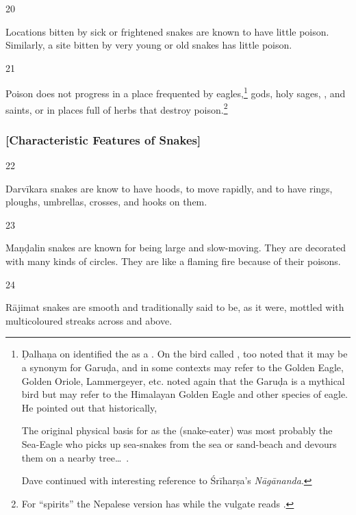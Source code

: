 \begin{translation}
\item [20]

Locations bitten by sick or frightened snakes are known to have little poison.  
Similarly, a site bitten by very young or old snakes has little poison.

\item [21]

Poison does not progress in a place frequented by
eagles,\footnote{Ḍalhaṇa on  identified the 
    as a . On the bird called , \citet[72\,ff,
    514]{dave} too noted that it may be a synonym for Garuḍa,
    and in some contexts may refer to the Golden Eagle, Golden
    Oriole, Lammergeyer, etc. \citet[199\,ff, 492]{dave} noted again that the
    Garuḍa is a mythical bird but may refer to the Himalayan Golden Eagle and
    other species of eagle.  He pointed out that historically,
    \begin{quoting}
        The original physical basis for  as the 
    (snake-eater) was most probably the Sea-Eagle who picks up sea-snakes
    from the sea or sand-beach and devours them on a nearby tree\ldots\  
    \citep[201]{dave}.
    \end{quoting} Dave
    continued with interesting reference to Śrīharṣa's \emph{Nāgānanda}.}
    gods, holy sages, \diff{spirits}, and saints, or in places full of herbs
    that destroy poison.\footnote{For “spirits” the Nepalese version has
        \dev{bhūta} while the vulgate reads \dev{yakṣa}.}

\subsubsection{[Characteristic Features of Snakes]}

\item [22]

Darvīkara snakes are know to have hoods, to move rapidly, and to have rings, 
ploughs, umbrellas, crosses, and hooks on them.


\item [23]

Maṇḍalin snakes are known for being large and slow-moving.  They are 
decorated with many kinds of circles. 
They are like a flaming fire because of their poisons.


\item [24]

Rājimat snakes are smooth and traditionally said to be, as it were,
mottled with multicoloured streaks across and above.


\end{translation}
